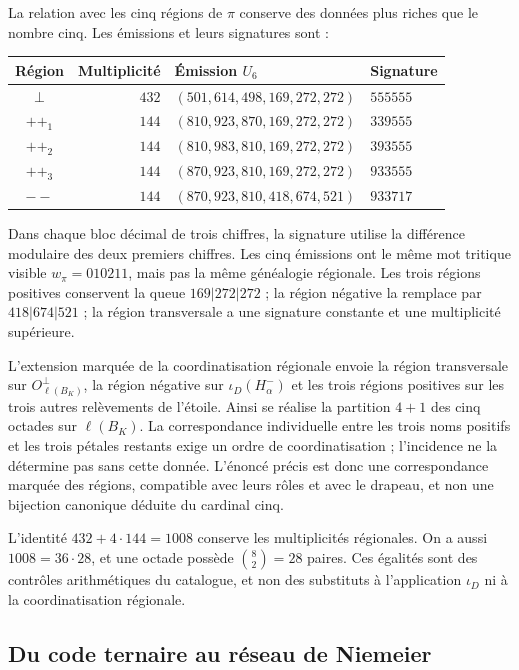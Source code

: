 La relation avec les cinq régions de $\pi$ conserve des données plus riches
que le nombre cinq. Les émissions et leurs signatures sont :
\begin{center}
\small
\begin{tabular}{@{}crll@{}}
\toprule
Région & Multiplicité & Émission $U_6$ & Signature \\
\midrule
$\perp$ & $432$ & $(501,614,498,169,272,272)$ & $555555$ \\
$++_1$ & $144$ & $(810,923,870,169,272,272)$ & $339555$ \\
$++_2$ & $144$ & $(810,983,810,169,272,272)$ & $393555$ \\
$++_3$ & $144$ & $(870,923,810,169,272,272)$ & $933555$ \\
$--$ & $144$ & $(870,923,810,418,674,521)$ & $933717$ \\
\bottomrule
\end{tabular}
\end{center}
Dans chaque bloc décimal de trois chiffres, la signature utilise la différence
modulaire des deux premiers chiffres. Les cinq émissions ont le
même mot tritique visible $w_\pi=010211$, mais pas la même
généalogie régionale. Les trois régions positives conservent la queue
$169|272|272$ ; la région négative la remplace par $418|674|521$ ;
la région transversale a une signature constante et une multiplicité supérieure.

L'extension marquée de la coordinatisation régionale envoie la région transversale
sur $O_{\ell(B_K)}^\perp$, la région négative sur $\iota_D(H^-_\alpha)$ et les
trois régions positives sur les trois autres relèvements de l'étoile. Ainsi se
réalise la partition $4+1$ des cinq octades sur $\ell(B_K)$.
La correspondance individuelle entre les trois noms positifs et
les trois pétales restants exige un ordre de coordinatisation ; l'incidence ne la détermine
pas sans cette donnée. L'énoncé précis est donc une
correspondance marquée des régions, compatible avec leurs rôles et avec
le drapeau, et non une bijection canonique déduite du cardinal cinq.

L'identité $432+4\cdot144=1008$ conserve les multiplicités
régionales. On a aussi $1008=36\cdot28$, et une octade possède
$\binom82=28$ paires. Ces égalités sont des contrôles arithmétiques du
catalogue, et non des substituts à l'application $\iota_D$ ni à la coordinatisation régionale.

\subsection{Du code ternaire au réseau de Niemeier}
\label{exc:niemeier}

